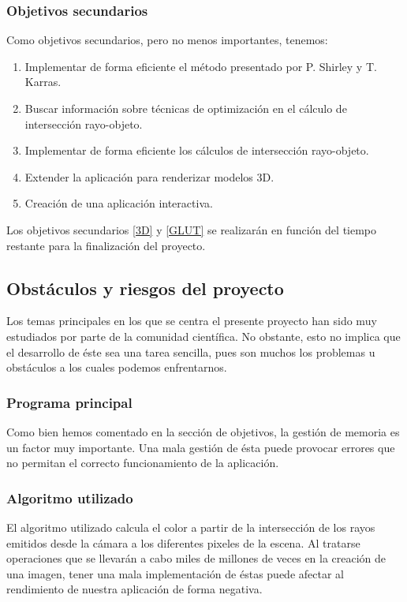 \documentclass[titlepage,12pt]{report}
\begin{document}
\subsubsection{Objetivos secundarios}

Como objetivos secundarios, pero no menos importantes, tenemos:

\begin{enumerate}
	\item Implementar de forma eficiente el método presentado por P. Shirley y T. Karras.
	\item Buscar información sobre técnicas de optimización en el cálculo de intersección rayo-objeto.
	\item Implementar de forma eficiente los cálculos de intersección rayo-objeto.
	\item \label{3D} Extender la aplicación para renderizar modelos 3D.
	\item \label{GLUT} Creación de una aplicación interactiva.
\end{enumerate}

Los objetivos secundarios \ref{3D} y \ref{GLUT} se realizarán en función del tiempo restante para la finalización del proyecto.

\subsection{Obstáculos y riesgos del proyecto}

Los temas principales en los que se centra el presente proyecto han sido muy estudiados por parte de la comunidad científica. No obstante, esto no implica que el desarrollo de éste sea una tarea sencilla, pues son muchos los problemas u obstáculos a los cuales podemos enfrentarnos.

\subsubsection{Programa principal}

Como bien hemos comentado en la sección de objetivos, la gestión de memoria es un factor muy importante. Una mala gestión de ésta puede provocar errores que no permitan el correcto funcionamiento de la aplicación.

\subsubsection{Algoritmo utilizado}

El algoritmo utilizado calcula el color a partir de la intersección de los rayos emitidos desde la cámara a los diferentes pixeles de la escena. Al tratarse operaciones que se llevarán a cabo miles de millones de veces en la creación de una imagen, tener una mala implementación de éstas puede afectar al rendimiento de nuestra aplicación de forma negativa.
\end{document}
